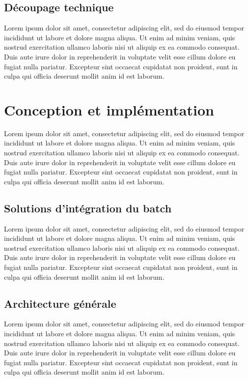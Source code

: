 \documentclass[a4paper, 12pt]{report}
\begin{document}
\subsection{Découpage technique}

Lorem ipsum dolor sit amet, consectetur adipiscing elit, sed do eiusmod tempor incididunt ut labore et dolore magna aliqua. Ut enim ad minim veniam, quis nostrud exercitation ullamco laboris nisi ut aliquip ex ea commodo consequat. Duis aute irure dolor in reprehenderit in voluptate velit esse cillum dolore eu fugiat nulla pariatur. Excepteur sint occaecat cupidatat non proident, sunt in culpa qui officia deserunt mollit anim id est laborum.

\section{Conception et implémentation}

Lorem ipsum dolor sit amet, consectetur adipiscing elit, sed do eiusmod tempor incididunt ut labore et dolore magna aliqua. Ut enim ad minim veniam, quis nostrud exercitation ullamco laboris nisi ut aliquip ex ea commodo consequat. Duis aute irure dolor in reprehenderit in voluptate velit esse cillum dolore eu fugiat nulla pariatur. Excepteur sint occaecat cupidatat non proident, sunt in culpa qui officia deserunt mollit anim id est laborum.

\subsection{Solutions d'intégration du batch}

Lorem ipsum dolor sit amet, consectetur adipiscing elit, sed do eiusmod tempor incididunt ut labore et dolore magna aliqua. Ut enim ad minim veniam, quis nostrud exercitation ullamco laboris nisi ut aliquip ex ea commodo consequat. Duis aute irure dolor in reprehenderit in voluptate velit esse cillum dolore eu fugiat nulla pariatur. Excepteur sint occaecat cupidatat non proident, sunt in culpa qui officia deserunt mollit anim id est laborum.

\subsection{Architecture générale}

Lorem ipsum dolor sit amet, consectetur adipiscing elit, sed do eiusmod tempor incididunt ut labore et dolore magna aliqua. Ut enim ad minim veniam, quis nostrud exercitation ullamco laboris nisi ut aliquip ex ea commodo consequat. Duis aute irure dolor in reprehenderit in voluptate velit esse cillum dolore eu fugiat nulla pariatur. Excepteur sint occaecat cupidatat non proident, sunt in culpa qui officia deserunt mollit anim id est laborum.
\end{document}
